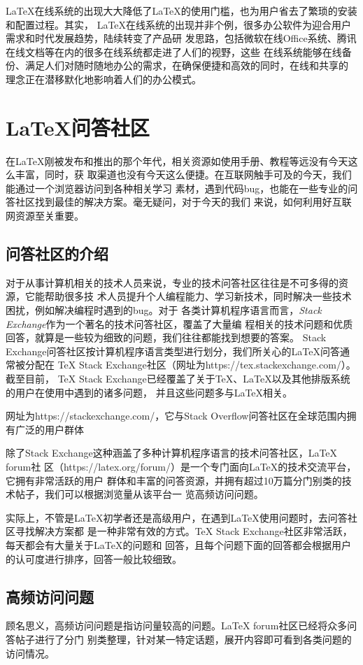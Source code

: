LaTeX在线系统的出现大大降低了LaTeX的使用门槛，也为用户省去了繁琐的安装和配置过程。其实，
LaTeX在线系统的出现并非个例，很多办公软件为迎合用户需求和时代发展趋势，陆续转变了产品研
发思路，包括微软在线Office系统、腾讯在线文档等在内的很多在线系统都走进了人们的视野，这些
在线系统能够在线备份、满足人们对随时随地办公的需求，在确保便捷和高效的同时，在线和共享的
理念正在潜移默化地影响着人们的办公模式。

\section{\LaTeX 问答社区}
在LaTeX刚被发布和推出的那个年代，相关资源如使用手册、教程等远没有今天这么丰富，同时，获
取渠道也没有今天这么便捷。在互联网触手可及的今天，我们能通过一个浏览器访问到各种相关学习
素材，遇到代码bug，也能在一些专业的问答社区找到最佳的解决方案。毫无疑问，对于今天的我们
来说，如何利用好互联网资源至关重要。

\subsection{问答社区的介绍}
对于从事计算机相关的技术人员来说，专业的技术问答社区往往是不可多得的资源，它能帮助很多技
术人员提升个人编程能力、学习新技术，同时解决一些技术困扰，例如解决编程时遇到的bug。对于
各类计算机程序语言而言，\emph{Stack Exchange}作为一个著名的技术问答社区，覆盖了大量编
程相关的技术问题和优质回答，就算是一些较为细致的问题，我们往往都能找到想要的答案。
Stack Exchange问答社区按计算机程序语言类型进行划分，我们所关心的LaTeX问答通常被分配在
TeX Stack Exchange社区（网址为https://tex.stackexchange.com/）。截至目前，
TeX Stack Exchange已经覆盖了关于TeX、LaTeX以及其他排版系统的用户在使用中遇到的诸多问题，
并且这些问题多与LaTeX相关。

\begin{tcolorbox}[colback=red!5!white, colframe=red!50!black, title=Stack Exchange]
    网址为https://stackexchange.com/，它与Stack Overflow问答社区在全球范围内拥有广泛的用户群体
\end{tcolorbox}

除了Stack Exchange这种涵盖了多种计算机程序语言的技术问答社区，LaTeX forum社
区（https://latex.org/forum/）是一个专门面向LaTeX的技术交流平台，它拥有非常活跃的用户
群体和丰富的问答资源，并拥有超过10万篇分门别类的技术帖子，我们可以根据浏览量从该平台一
览高频访问问题。

实际上，不管是LaTeX初学者还是高级用户，在遇到LaTeX使用问题时，去问答社区寻找解决方案都
是一种非常有效的方式。TeX Stack Exchange社区非常活跃，每天都会有大量关于LaTeX的问题和
回答，且每个问题下面的回答都会根据用户的认可度进行排序，回答一般比较细致。

\subsection{高频访问问题}
顾名思义，高频访问问题是指访问量较高的问题。LaTeX forum社区已经将众多问答帖子进行了分门
别类整理，针对某一特定话题，展开内容即可看到各类问题的访问情况。
